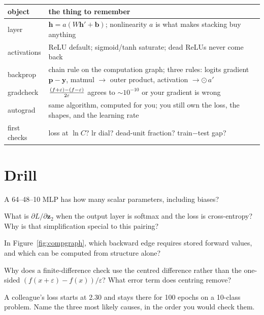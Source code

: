 \begin{center}\small
\begin{tabular}{p{}p{}}
\toprule
object & the thing to remember \\
\midrule
layer & $\mathbf h=a(W\mathbf h'+\mathbf b)$; nonlinearity $a$ is what
makes stacking buy anything \\
activations & ReLU default; sigmoid/tanh saturate; dead ReLUs never
come back \\
backprop & chain rule on the computation graph; three rules: logits
gradient $\mathbf p-\mathbf y$, matmul $\to$ outer product, activation
$\to\odot\,a'$ \\
gradcheck & $(f{+}\varepsilon)-(f{-}\varepsilon)\over2\varepsilon$
agrees to $\sim10^{-10}$ or your gradient is wrong \\
autograd & same algorithm, computed for you; you still own the loss,
the shapes, and the learning rate \\
first checks & loss at $\ln C$? lr dial? dead-unit fraction?
train$-$test gap? \\
\bottomrule
\end{tabular}
\end{center}

\section*{Drill}
\begin{exercise}[{[easy]}]
A 64--48--10 MLP has how many scalar parameters, including biases?
\end{exercise}
\begin{exercise}[{[easy]}]
What is $\partial L/\partial\mathbf z_2$ when the output layer is
softmax and the loss is cross-entropy? Why is that simplification
special to this pairing?
\end{exercise}
\begin{exercise}[{[medium]}]
In Figure~\ref{fig:compgraph}, which backward edge requires stored
forward values, and which can be computed from structure alone?
\end{exercise}
\begin{exercise}[{[medium]}]
Why does a finite-difference check use the centred difference rather
than the one-sided $(f(x+\varepsilon)-f(x))/\varepsilon$? What error
term does centring remove?
\end{exercise}
\begin{exercise}[{[hard]}]
A colleague's loss starts at 2.30 and stays there for 100 epochs on a
10-class problem. Name the three most likely causes, in the order you
would check them.
\end{exercise}

